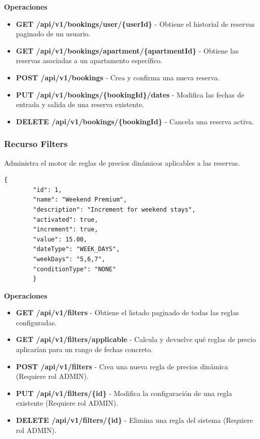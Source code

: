         \textbf{Operaciones}
        \begin{itemize}
            \item \textbf{GET /api/v1/bookings/user/\{userId\}} - Obtiene el historial de reservas paginado de un usuario.
            \item \textbf{GET /api/v1/bookings/apartment/\{apartmentId\}} - Obtiene las reservas asociadas a un apartamento específico.
            \item \textbf{POST /api/v1/bookings} - Crea y confirma una nueva reserva.
            \item \textbf{PUT /api/v1/bookings/\{bookingId\}/dates} - Modifica las fechas de entrada y salida de una reserva existente.
            \item \textbf{DELETE /api/v1/bookings/\{bookingId\}} - Cancela una reserva activa.
        \end{itemize}

    \subsubsection{Recurso Filters}
        Administra el motor de reglas de precios dinámicos aplicables a las reservas.
        \begin{lstlisting}[basicstyle=\jsonbasicfont,frame=single,backgroundcolor=\color{white},rulecolor=\color{black},framerule=0.5pt,numbers=none]
        {
        "id": 1,
        "name": "Weekend Premium",
        "description": "Increment for weekend stays",
        "activated": true,
        "increment": true,
        "value": 15.00,
        "dateType": "WEEK_DAYS",
        "weekDays": "5,6,7",
        "conditionType": "NONE"
        }
        \end{lstlisting}

        \textbf{Operaciones}
        \begin{itemize}
            \item \textbf{GET /api/v1/filters} - Obtiene el listado paginado de todas las reglas configuradas.
            \item \textbf{GET /api/v1/filters/applicable} - Calcula y devuelve qué reglas de precio aplicarían para un rango de fechas concreto.
            \item \textbf{POST /api/v1/filters} - Crea una nueva regla de precios dinámica (Requiere rol ADMIN).
            \item \textbf{PUT /api/v1/filters/\{id\}} - Modifica la configuración de una regla existente (Requiere rol ADMIN).
            \item \textbf{DELETE /api/v1/filters/\{id\}} - Elimina una regla del sistema (Requiere rol ADMIN).
        \end{itemize}

